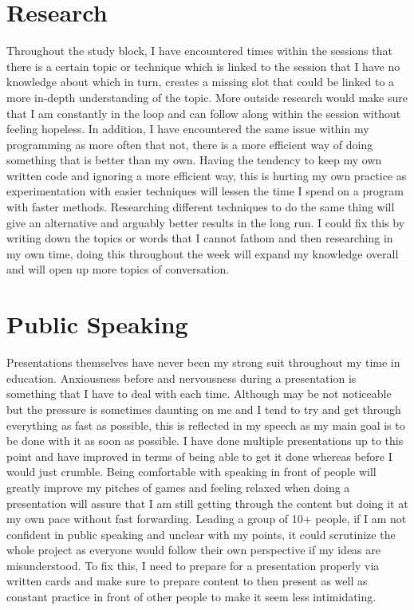 \documentclass{scrartcl}
\begin{document}
\section{Research}

Throughout the study block, I have encountered times within the sessions that there is a certain topic or technique which is linked to the session that I have no knowledge about which in turn, creates a missing slot that could be linked to a more in-depth understanding of the topic. More outside research would make sure that I am constantly in the loop and can follow along within the session without feeling hopeless. In addition, I have encountered the same issue within my programming as more often that not, there is a more efficient way of doing something that is better than my own. Having the tendency to keep my own written code and ignoring a more efficient way, this is hurting my own practice as experimentation with easier techniques will lessen the time I spend on a program with faster methods. Researching different techniques to do the same thing will give an alternative and arguably better results in the long run. I could fix this by writing down the topics or words that I cannot fathom and then researching in my own time, doing this throughout the week will expand my knowledge overall and will open up more topics of conversation.

\section{Public Speaking}
Presentations themselves have never been my strong suit throughout my time in education. Anxiousness before and nervousness during a presentation is something that I have to deal with each time. Although may be not noticeable but the pressure is sometimes daunting on me and I tend to try and get through everything as fast as possible, this is reflected in my speech as my main goal is to be done with it as soon as possible. I have done multiple presentations up to this point and have improved in terms of being able to get it done whereas before I would just crumble. Being comfortable with speaking in front of people will greatly improve my pitches of games and feeling relaxed when doing a presentation will assure that I am still getting through the content but doing it at my own pace without fast forwarding. Leading a group of 10+ people, if I am not confident in public speaking and unclear with my points, it could scrutinize the whole project as everyone would follow their own perspective if my ideas are misunderstood. To fix this, I need to prepare for a presentation properly via written cards and make sure to prepare content to then present as well as constant practice in front of other people to make it seem less intimidating.
\end{document}
